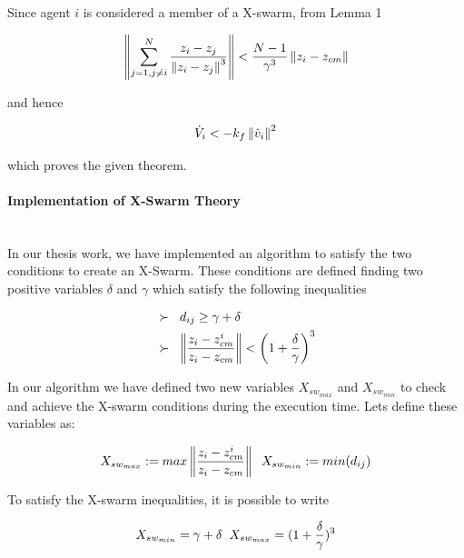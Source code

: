 Since agent $i$ is considered a member of a X-swarm, from Lemma 1

\begin{equation}
\left\lVert \sum_{j=1, j \neq i}^{N} \frac{z_i - z_j}{\left\lVert z_i - z_j\right\rVert^3}\right\rVert < \frac{N-1}{\gamma^3} \left\lVert z_i - z_{cm}\right\rVert
\end{equation}

and hence

\begin{equation}
\dot{V}_i < -k_f \left\lVert\dot{v}_i\right\rVert ^2
\end{equation}

which proves the given theorem.  \newline

\paragraph{Implementation of X-Swarm Theory}\hspace{0pt} \\		
In our thesis work, we have implemented an algorithm to satisfy the two conditions to create an X-Swarm. These conditions are defined finding  two positive variables $\delta$ and  $ \gamma$ which satisfy the following inequalities

\begin{align}
\begin{split}
&\succ\hspace{0.2cm}  d_{ij} \geq \gamma + \delta \\
&\succ \hspace{0.2cm}   \left\lVert\frac{z_i - z_{cm}^i}{z_i - z_{cm}}\right\rVert < \left(1+\frac{\delta}{\gamma}\right)^3
\end{split}
\end{align}
		
In our algorithm we have defined two new variables $X_{sw_{max}}$ and $X_{sw_{min}}$ to check and achieve the X-swarm conditions during the execution time. Lets define these variables as:

\begin{equation}
X_{sw_{max}} := max \left\lVert\frac{z_i - z_{cm}^i}{z_i - z_{cm}}\right\rVert  \hspace{0.2cm} X_{sw_{min}} := min(d_{ij})
\end{equation}

To satisfy the X-swarm inequalities, it is possible to write 

\begin{equation}
 X_{sw_{min}} = \gamma + \delta  \hspace{0.2cm} X_{sw_{max}} = (1 + \frac{\delta}{\gamma})^3
\end{equation}

